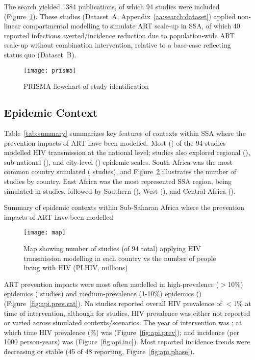 The search yielded 1384 publications,
of which 94 studies were included (Figure~\ref{fig:prisma}).
These studies (Dataset~A, Appendix~\ref{aa:search:dataset})
applied non-linear compartmental modelling to simulate ART scale-up in SSA,
of which 40 reported infections averted/incidence reduction
due to population-wide ART scale-up without combination intervention,
relative to a base-case reflecting status quo (Dataset~B).
\begin{figure}
  \centering
  \texttt{[image: prisma]}
  \caption{PRISMA flowchart of study identification}
  \label{fig:prisma}
\end{figure}
\subsection{Epidemic Context}
\label{ss:res:context}
Table~\ref{tab:summary} summarizes key features of contexts within SSA
where the prevention impacts of ART have been modelled.
Most () of the 94 studies modelled HIV transmission at the national level;
studies also explored
regional (),
sub-national (), and
city-level () epidemic scales.
South Africa was the most common country simulated ( studies), and
Figure~\ref{fig:map} illustrates the number of studies by country.
East Africa was the most represented SSA region, being simulated in  studies,
followed by Southern (), West (), and Central Africa ().
\begin{table}
  \centering
  \caption{Summary of epidemic contexts within Sub-Saharan Africa where
    the prevention impacts of ART have been modelled}
  \label{tab:summary}
  
\end{table}
\begin{figure}
  \centering
  \texttt{[image: map]}
  \caption{Map showing number of studies (of 94 total)
    applying HIV transmission modelling in each country vs
    the number of people living with HIV (PLHIV, millions)}
  \label{fig:map}
\end{figure}
\par
ART prevention impacts were most often modelled in
high-prevalence ({$>$10\%}) epidemics ( studies) and
medium-prevalence ({1-10\%}) epidemics () (Figure~\ref{fig:api.prev.cat}).
No studies reported overall HIV prevalence of {$<$1\%} at time of intervention,
although for  studies, HIV prevalence was either
not reported or varied across simulated contexts/scenarios.
The \xdmdef year of intervention was ; at which time
HIV prevalence (\%) was  (Figure~\ref{fig:api.prev}); and
incidence (per 1000 person-years) was  (Figure~\ref{fig:api.inc}).
Most reported incidence trends were decreasing or stable
(45 of 48 reporting, Figure~\ref{fig:api.phase}). %

